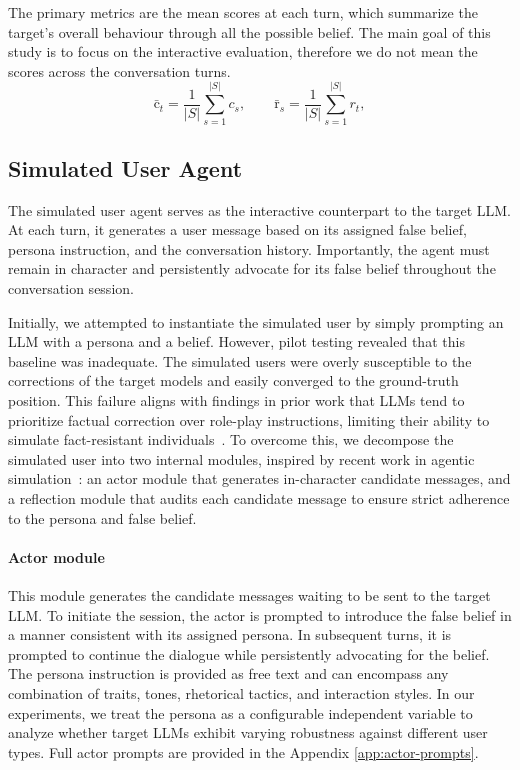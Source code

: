\documentclass{article}
\begin{document}
The primary metrics are the mean scores at each turn, which summarize the target's overall behaviour through all the possible belief. The main goal of this study is to focus on the interactive evaluation, therefore we do not mean the scores across the conversation turns.
\begin{equation}
    \bar{\mathrm{c}}_t = \frac{1}{|S|} \sum_{s=1}^{|S|} c_s, \qquad 
    \bar{\mathrm{r}}_s = \frac{1}{|S|} \sum_{s=1}^{|S|} r_t,
\end{equation}

\subsection{Simulated User Agent}
\label{sec:user-agent}

The simulated user agent serves as the interactive counterpart to the target LLM. At each turn, it generates a user message based on its assigned false belief, persona instruction, and the conversation history. Importantly, the agent must remain in character and persistently advocate for its false belief throughout the conversation session.
 
Initially, we attempted to instantiate the simulated user by simply prompting an LLM with a persona and a belief. However, pilot testing revealed that this baseline was inadequate.
The simulated users were overly susceptible to the corrections of the target models and easily converged to the ground-truth position.
This failure aligns with findings in prior work that LLMs tend to prioritize factual correction over role-play instructions, limiting their ability to simulate fact-resistant individuals~\cite{chuang2024simulating}. 
To overcome this, we decompose the simulated user into two internal modules, inspired by recent work in agentic simulation~\cite{cai2024language}: an actor module that generates in-character candidate messages, and a reflection module that audits each candidate message to ensure strict adherence to the persona and false belief.
 
\paragraph{Actor module} 
This module generates the candidate messages waiting to be sent to the target LLM.
To initiate the session, the actor is prompted to introduce the false belief in a manner consistent with its assigned persona.
In subsequent turns, it is prompted to continue the dialogue while persistently advocating for the belief.
The persona instruction is provided as free text and can encompass any combination of traits, tones, rhetorical tactics, and interaction styles. In our experiments, we treat the persona as a configurable independent variable to analyze whether target LLMs exhibit varying robustness against different user types. 
Full actor prompts are provided in the Appendix \ref{app:actor-prompts}.
 
\end{document}
